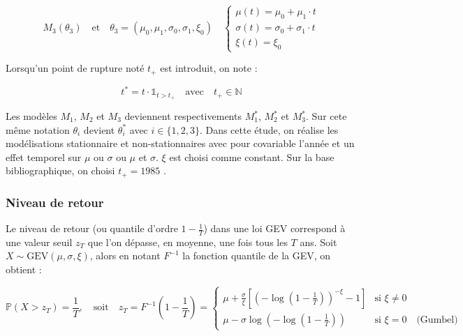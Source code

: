 \documentclass[
  article,
  nofooter,
  noheadings]{jss}
\begin{document}
\[
M_3(\theta_3) \quad \text{et} \quad \theta_3 = (\mu_0, \mu_1, \sigma_0, \sigma_1, \xi_0)
\quad
\begin{cases}
\mu(t) = \mu_0 + \mu_1 \cdot t\\
\sigma(t) = \sigma_0 + \sigma_1 \cdot t \\
\xi(t) = \xi_0
\end{cases}
\]

Lorsqu'un point de rupture noté \(t_+\) est introduit, on note :

\[
t^\ast = t \cdot \mathbb{1}_{t > t_+} \quad \text{avec} \quad t_+ \in \mathbb{N}
\]

Les modèles \(M_1\), \(M_2\) et \(M_3\) deviennent respectivements
\(M_1^\ast\), \(M_2^\ast\) et \(M_3^\ast\). Sur cete même notation
\(\theta_i\) devient \(\theta^\ast_i\) avec \(i \in \{1, 2, 3\}\). Dans
cette étude, on réalise les modélisations stationnaire et
non-stationnaires avec pour covariable l'année et un effet temporel sur
\(\mu\) ou \(\sigma\) ou \(\mu\) et \(\sigma\). \(\xi\) est choisi comme
constant. Sur la base bibliographique, on choisi \(t_+ = 1985\)
\citep{blanchet2022instrumental}.

\subsubsection{Niveau de retour}\label{niveau-de-retour}

Le niveau de retour (ou quantile d'ordre \(1 - \tfrac{1}{T}\)) dans une
loi GEV correspond à une valeur seuil \(z_T\) que l'on dépasse, en
moyenne, une fois tous les \(T\) ans. Soit
\(X \sim \mathrm{GEV}(\mu, \sigma, \xi)\), alors en notant \(F^{-1}\) la
fonction quantile de la GEV, on obtient :

\begin{tcolorbox}[enhanced jigsaw, breakable, bottomrule=.15mm, rightrule=.15mm, left=2mm, leftrule=.75mm, opacityback=0, colback=white, arc=.35mm, toprule=.15mm, colframe=quarto-callout-color-frame]

\[
\mathbb{P}(X > z_T) = \frac{1}{T}, \quad \text{soit} \quad z_T = F^{-1}\left(1 - \frac{1}{T} \right) = 
\begin{cases}
\mu + \frac{\sigma}{\xi} \left[ \left( -\log\left(1 - \frac{1}{T}\right) \right)^{-\xi} - 1 \right] & \text{si } \xi \ne 0 \\
\mu - \sigma \log \left( -\log\left(1 - \frac{1}{T} \right) \right) & \text{si } \xi = 0 \quad \text{(Gumbel)}
\end{cases}
\]

\end{tcolorbox}
\end{document}
